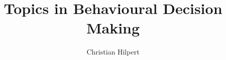 \documentclass[a4paper, 12pt]{article}
\newcommand{\papertitle}{\large Topics in Behavioural Decision Making}
\begin{document}

 \frenchspacing

\title{\sffamily\bfseries%
	\papertitle%
}

\author[a]{Christian Hilpert}


\date{}

\maketitle
\renewcommand{\blindmarkup}[1]{\emph{#1}}
\blindmathfalse



\nocite{AzevedoGottlieb2012,Barberis2012a,Barberis2013a,Barberis2017Talk,EbertStrack2015, EbertStrack2015Appendix, KahnemanTversky1979,KoeszegiRabin2006,KoeszegiRabin2007,Rabin2000,Thaler2016,TverskyKahneman1992,Wakker2010}

\begin{refcontext}[sorting=nyt]  %
\printbibliography[heading=bibintoc]
\end{refcontext}
\end{document}
